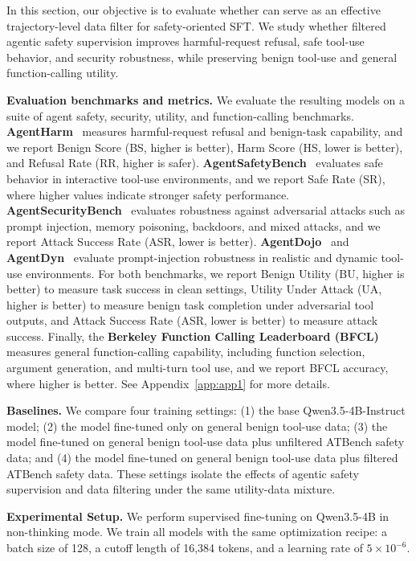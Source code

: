 In this section, our objective is to evaluate whether \toolAG{} can serve as an effective trajectory-level data filter for safety-oriented SFT. We study whether filtered agentic safety supervision improves harmful-request refusal, safe tool-use behavior, and security robustness, while preserving benign tool-use and general function-calling utility.



\textbf{Evaluation benchmarks and metrics.}
We evaluate the resulting models on a suite of agent safety, security, utility, and function-calling benchmarks.
\textbf{AgentHarm}~\citep{agentharm2024} measures harmful-request refusal and benign-task capability, and we report Benign Score (BS, higher is better), Harm Score (HS, lower is better), and Refusal Rate (RR, higher is safer).
\textbf{AgentSafetyBench}~\citep{zhang2024agentsafetybench} evaluates safe behavior in interactive tool-use environments, and we report Safe Rate (SR), where higher values indicate stronger safety performance.
\textbf{AgentSecurityBench}~\citep{zhang2025agent} evaluates robustness against adversarial attacks such as prompt injection, memory poisoning, backdoors, and mixed attacks, and we report Attack Success Rate (ASR, lower is better).
\textbf{AgentDojo}~\citep{agentdojo2024} and \textbf{AgentDyn}~\citep{li2026agentdyn} evaluate prompt-injection robustness in realistic and dynamic tool-use environments. For both benchmarks, we report Benign Utility (BU, higher is better) to measure task success in clean settings, Utility Under Attack (UA, higher is better) to measure benign task completion under adversarial tool outputs, and Attack Success Rate (ASR, lower is better) to measure attack success.
Finally, the \textbf{Berkeley Function Calling Leaderboard (BFCL)}~\citep{patil2025bfcl}  measures general function-calling capability, including function selection, argument generation, and multi-turn tool use, and we report BFCL accuracy, where higher is better. See Appendix~\ref{app:app1} for more details.

\textbf{Baselines.}
We compare four training settings: (1) the base Qwen3.5-4B-Instruct model; (2) the model fine-tuned only on general benign tool-use data; (3) the model fine-tuned on general benign tool-use data plus unfiltered ATBench safety data; and (4) the model fine-tuned on general benign tool-use data plus filtered ATBench safety data. These settings isolate the effects of agentic safety supervision and data filtering under the same utility-data mixture.

\textbf{Experimental Setup.} 
We perform supervised fine-tuning on Qwen3.5-4B in non-thinking mode. 
We train all models with the same optimization recipe: a batch size of 128, a cutoff length of 16,384 tokens, and a learning rate of \(5\times10^{-6}\).

